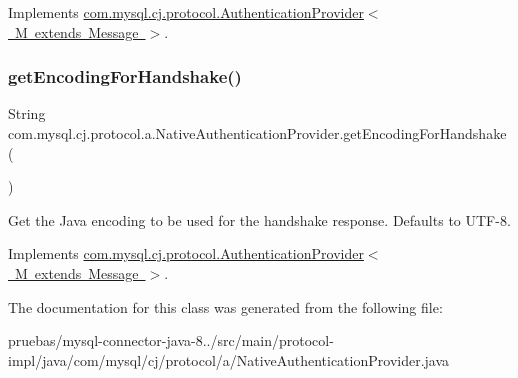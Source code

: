 Implements \mbox{\hyperlink{interfacecom_1_1mysql_1_1cj_1_1protocol_1_1_authentication_provider}{com.\+mysql.\+cj.\+protocol.\+Authentication\+Provider$<$ M extends Message $>$}}.

\mbox{\label{classcom_1_1mysql_1_1cj_1_1protocol_1_1a_1_1_native_authentication_provider_a27c5a8cd7397eb15934b3b3048dc161d}} 
\subsubsection{\texorpdfstring{get\+Encoding\+For\+Handshake()}{getEncodingForHandshake()}}
{\footnotesize\ttfamily String com.\+mysql.\+cj.\+protocol.\+a.\+Native\+Authentication\+Provider.\+get\+Encoding\+For\+Handshake (\begin{DoxyParamCaption}{ }\end{DoxyParamCaption})}

Get the Java encoding to be used for the handshake response. Defaults to U\+T\+F-\/8. 

Implements \mbox{\hyperlink{interfacecom_1_1mysql_1_1cj_1_1protocol_1_1_authentication_provider}{com.\+mysql.\+cj.\+protocol.\+Authentication\+Provider$<$ M extends Message $>$}}.



The documentation for this class was generated from the following file\+:\begin{DoxyCompactItemize}
\item 
pruebas/mysql-\/connector-\/java-\/8../src/main/protocol-\/impl/java/com/mysql/cj/protocol/a/Native\+Authentication\+Provider.\+java\end{DoxyCompactItemize}
